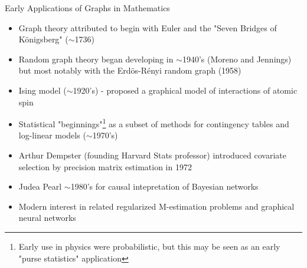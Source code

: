 \documentclass{beamer}
\begin{document}
\begin{frame}{Early Applications of Graphs in Mathematics}
    \begin{itemize}
        \item Graph theory attributed to begin with Euler and the "Seven Bridges of K\"onigsberg" ($\sim$1736)
        \item Random graph theory began developing in $\sim$1940's (Moreno and Jennings) but most notably with the Erd\"os-R\'enyi random graph (1958)
        \item Ising model ($\sim$1920's) - proposed a graphical model of interactions of atomic spin
        \item Statistical "beginnings"\footnote{Early use in physics were probabilistic, but this may be seen as an early "purse statistics" application} as a subset of methods for contingency tables and log-linear models ($\sim$1970's)
        \item Arthur Dempster (founding Harvard Stats professor) introduced covariate selection by precision matrix estimation in 1972 \cite{dempster_covariance_1972}
        \item Judea Pearl $\sim$1980's for causal intepretation of Bayesian networks
        \item Modern interest in related regularized M-estimation problems and graphical neural networks 
    \end{itemize}
\end{frame}
\end{document}
